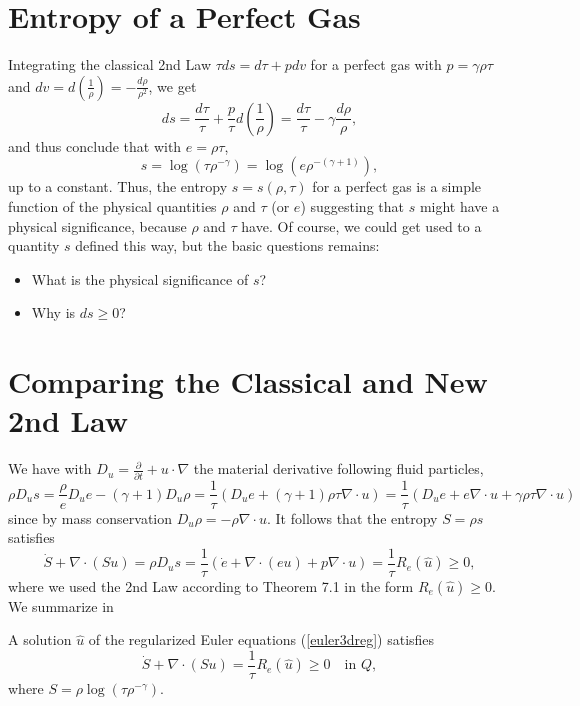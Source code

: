 \section{Entropy of a Perfect Gas}

Integrating the classical 2nd Law
$\tau ds=d\tau +pdv$ for a perfect gas with
$p=\gamma \rho\tau$
and $dv=d(\frac{1}{\rho})=-\frac{d\rho}{\rho^2}$, we get
\[
ds=\frac{d\tau}{\tau}+\frac{p}{\tau}d(\frac{1}{\rho})=
\frac{d\tau}{\tau}-\gamma \frac{d\rho}{\rho},
\]
and thus conclude that with $e=\rho\tau$,
\begin{equation}\label{STrho}
s=\log(\tau\rho^{-\gamma})=
\log(e\rho^{-(\gamma +1)}),
\end{equation}
up to a constant. Thus, the entropy $s=s(\rho ,\tau )$ 
for a perfect gas is a simple function of the physical quantities 
$\rho$ and $\tau$ (or $e$) suggesting  
that $s$ might have a physical significance, because
$\rho$ and $\tau$ have. Of course, we could get used 
to a quantity $s$ defined this way, but the basic
questions remains: 
\begin{itemize}
\item  What is the physical significance of $s$? 
\item  Why is $ds\ge 0$? 
\end{itemize} 

 
\section{Comparing the Classical and New 2nd Law}

We have with $D_u
=\frac{\partial}{\partial t}+u\cdot\nabla$
the material derivative following fluid particles,
\[
\rho D_us=\frac{\rho}{e}D_ue-(\gamma +1) D_u\rho=
\frac{1}{\tau}(D_ue+(\gamma +1)\rho\tau\nabla\cdot u )=
\frac{1}{\tau}(D_ue+e\nabla\cdot u +\gamma \rho\tau\nabla\cdot u)
\]
since by mass conservation $D_u\rho =-\rho\nabla\cdot u$.
It follows that the entropy $S=\rho s$ satisfies 
\begin{equation}
\dot S+\nabla\cdot (Su)=\rho D_us=
\frac{1}{\tau}(\dot e+\nabla\cdot (eu)+p\nabla\cdot u)
=\frac{1}{\tau}R_e(\hat u)\ge 0,
\end{equation}
where we used the 2nd Law according to Theorem 7.1
in the form $R_e(\hat u)\ge 0$. 
We summarize in 
\begin{theorem}\label{2ndlawclassical}
A solution $\hat u$ of the regularized Euler equations (\ref{euler3dreg})
satisfies 
\begin{equation}\label{2ndlawS}
\dot S+\nabla\cdot (Su)=\frac{1}{\tau}R_e(\hat u)\ge 0 \quad\mbox{in }Q,
\end{equation}
where $S=\rho\log(\tau\rho^{-\gamma})$.
\end{theorem}

